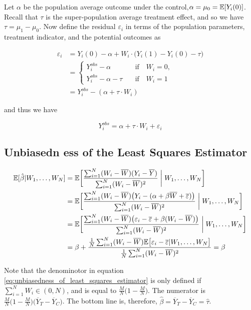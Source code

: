 Let $\alpha$ be the population average outcome under the control,$\alpha = \mu_0 = {\mathbb{E}}[Y_i(0)]$.
Recall that $\tau$ is the super-population average treatment effect, 
and so we have $\tau = \mu_1 - \mu_0$.
Now define the residual $\varepsilon_i$ in terms of the population parameters, treatment indicator, and the potential outcomes as

\begin{align}
    \varepsilon_i &= Y_i(0) - \alpha + W_i\cdot\bigl(Y_i(1) - Y_i(0) - \tau\bigr) \\
    &=\begin{cases}
        Y_i^{obs} - \alpha &\quad \text{if} \quad W_i=0,\\
        Y_i^{obs} - \alpha - \tau &\quad \text{if} \quad W_i=1
    \end{cases}\\
    &= Y_i^{obs} - (\alpha +\tau\cdot W_i)
\end{align}

and thus we have

$$
Y_i^{obs} = \alpha +\tau\cdot W_i + \varepsilon_i
$$

\subsection{Unbiasedn
ess of the Least Squares Estimator}

\begin{align}
    {\mathbb{E}}[\hat\beta|W_1, \dots, W_N] &= {\mathbb{E}}\biggl[\frac{\sum_{i=1}^N (W_i - \overline{W})(Y_i - \overline{Y})}{\sum_{i=1}^N (W_i - \overline{W})^2}\biggm|W_1, \dots, W_N\biggr]\\
    &= {\mathbb{E}}\biggl[\frac{\sum_{i=1}^N (W_i - \overline{W})\bigl(Y_i - (\alpha + \beta \overline{W} + \overline{\varepsilon})\bigr)}{\sum_{i=1}^N (W_i - \overline{W})^2}\biggm|W_1, \dots, W_N\biggr]\\
    &= {\mathbb{E}}\biggl[\frac{\sum_{i=1}^N (W_i - \overline{W})\bigl(\varepsilon_i - \overline{\varepsilon} + \beta(W_i - \overline{W})\bigr)}{\sum_{i=1}^N (W_i - \overline{W})^2}\biggm|W_1, \dots, W_N\biggr]\\
    &= \beta + \frac{\frac{1}{N} \sum_{i=1}^N (W_i - \overline{W}){\mathbb{E}}\bigl[\varepsilon_i - \overline{\varepsilon}| W_1, \dots, W_N\bigr]}{\frac{1}{N} \sum_{i=1}^N (W_i - \overline{W})^2} = \beta \label{eq:unbiasedness_of_least_squares_estimator} 
\end{align}

Note that the denominotor in equation \eqref{eq:unbiasedness_of_least_squares_estimator} is only defined if $\sum_{i=1}^N W_i \in (0, N)$, and is equal to $\frac{M}{N}\bigl(1-\frac{M}{N}\bigr)$.
The numerator is $\frac{M}{N}\bigl(1-\frac{M}{N}\bigr)\bigl(\overline{Y}_T - \overline{Y}_C\bigr)$.
The bottom line is, therefore, $\hat\beta = \overline{Y}_T - \overline{Y}_C = \hat\tau$.

